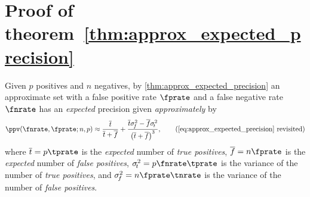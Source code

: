 
\section{Proof of theorem~\ref{thm:approx_expected_precision}}
\label{sec:proof_approx_expected_precision}
Given $p$ positives and $n$ negatives, by \cref{thm:approx_expected_precision} an approximate set with a false positive rate $\fprate$ and a false negative rate $\fnrate$ has an \emph{expected} precision given \emph{approximately} by
\begin{equation*}
    \ppv(\fnrate, \fprate ; n, p) \approx \frac{\overline{t}}{\overline{t} + \overline{f}} +
    \frac{\overline{t} \sigma_{\!f}^2 - \overline{f} \sigma_{\!t}^2}{\left(\overline{t} + \overline{f}\right)^3},
    \tag{\ref{eq:approx_expected_precision} revisited}
\end{equation*}
where $\overline{t} = p \tprate$ is the \emph{expected} number of \emph{true positives}, $\overline{f} =  n \fprate$ is the \emph{expected} number of \emph{false positives}, $\sigma_{\!t}^2 = p \fnrate \tprate$ is the variance of the number of \emph{true positives}, and $\sigma_{\!f}^2 = n \fprate \tnrate$ is the variance of the number of \emph{false positives}.
